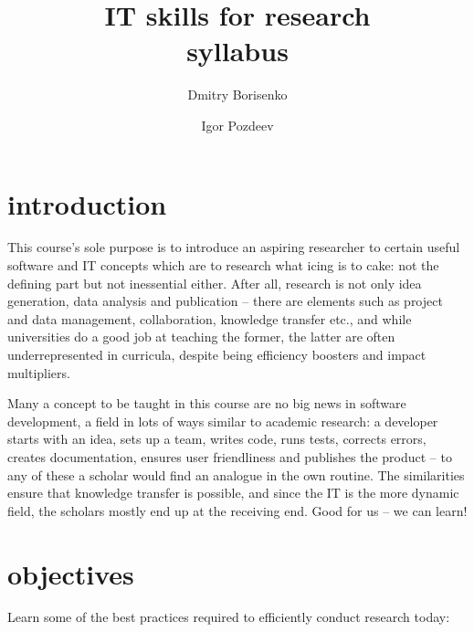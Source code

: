 \documentclass[12pt]{article}
\title{IT skills for research \\[24pt] \large syllabus}
\author{
    Dmitry Borisenko 
    \and
    Igor Pozdeev
}
\date{}
\begin{document}
\maketitle

\section*{introduction} %
\label{sec:introduction}

This course's sole purpose is to introduce an aspiring researcher to certain useful software and IT concepts which are to research what icing is to cake: not the defining part but not inessential either. After all, research is not only idea generation, data analysis and publication -- there are elements such as project and data management, collaboration, knowledge transfer etc., and while universities do a good job at teaching the former, the latter are often underrepresented in curricula, despite being efficiency boosters and impact multipliers.

Many a concept to be taught in this course are no big news in software development, a field in lots of ways similar to academic research: a developer starts with an idea, sets up a team, writes code, runs tests, corrects errors, creates documentation, ensures user friendliness and publishes the product -- to any of these a scholar would find an analogue in the own routine. The similarities ensure that knowledge transfer is possible, and since the IT is the more dynamic field, the scholars mostly end up at the receiving end. Good for us -- we can learn!


\newpage
\section*{objectives} %
\label{sec:objectives}

Learn some of the best practices required to efficiently conduct research today:
\end{document}
